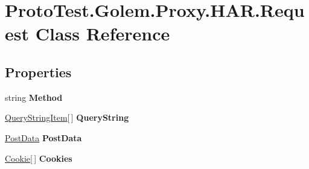 \hypertarget{class_proto_test_1_1_golem_1_1_proxy_1_1_h_a_r_1_1_request}{\section{Proto\-Test.\-Golem.\-Proxy.\-H\-A\-R.\-Request Class Reference}
\label{class_proto_test_1_1_golem_1_1_proxy_1_1_h_a_r_1_1_request}
}
\subsection*{Properties}
\begin{DoxyCompactItemize}
\item 
\hypertarget{class_proto_test_1_1_golem_1_1_proxy_1_1_h_a_r_1_1_request_ab6c91d91dd47cec7b7c05b7fb2fcd6c0}{string {\bfseries Method}}\label{class_proto_test_1_1_golem_1_1_proxy_1_1_h_a_r_1_1_request_ab6c91d91dd47cec7b7c05b7fb2fcd6c0}

\item 
\hypertarget{class_proto_test_1_1_golem_1_1_proxy_1_1_h_a_r_1_1_request_a959a8f56d4da8b0cdeaa94df8b51e61c}{\hyperlink{class_proto_test_1_1_golem_1_1_proxy_1_1_h_a_r_1_1_query_string_item}{Query\-String\-Item}\mbox{[}$\,$\mbox{]} {\bfseries Query\-String}}\label{class_proto_test_1_1_golem_1_1_proxy_1_1_h_a_r_1_1_request_a959a8f56d4da8b0cdeaa94df8b51e61c}

\item 
\hypertarget{class_proto_test_1_1_golem_1_1_proxy_1_1_h_a_r_1_1_request_a8521f7854b4d9bced3bf11fb915b66a4}{\hyperlink{class_proto_test_1_1_golem_1_1_proxy_1_1_h_a_r_1_1_post_data}{Post\-Data} {\bfseries Post\-Data}}\label{class_proto_test_1_1_golem_1_1_proxy_1_1_h_a_r_1_1_request_a8521f7854b4d9bced3bf11fb915b66a4}

\item 
\hypertarget{class_proto_test_1_1_golem_1_1_proxy_1_1_h_a_r_1_1_request_ab74fbb3671457feeebdbd1aecec3a890}{\hyperlink{class_proto_test_1_1_golem_1_1_proxy_1_1_h_a_r_1_1_cookie}{Cookie}\mbox{[}$\,$\mbox{]} {\bfseries Cookies}}\label{class_proto_test_1_1_golem_1_1_proxy_1_1_h_a_r_1_1_request_ab74fbb3671457feeebdbd1aecec3a890}


\end{DoxyCompactItemize}
